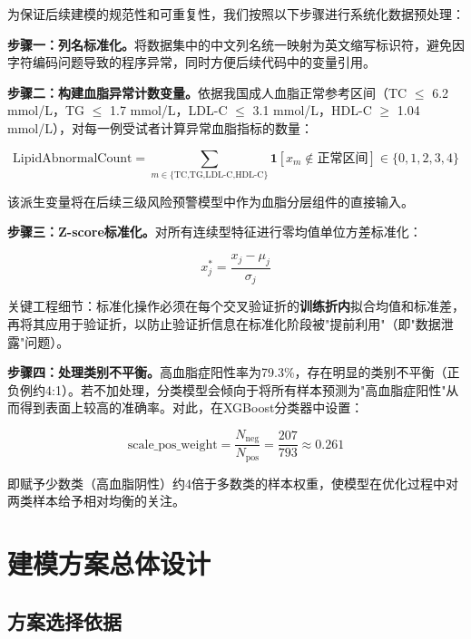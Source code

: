 \documentclass[12pt,a4paper]{ctexart}
\begin{document}
为保证后续建模的规范性和可重复性，我们按照以下步骤进行系统化数据预处理：

\textbf{步骤一：列名标准化。}将数据集中的中文列名统一映射为英文缩写标识符，避免因字符编码问题导致的程序异常，同时方便后续代码中的变量引用。

\textbf{步骤二：构建血脂异常计数变量。}依据我国成人血脂正常参考区间（TC $\leq$ 6.2 mmol/L，TG $\leq$ 1.7 mmol/L，LDL-C $\leq$ 3.1 mmol/L，HDL-C $\geq$ 1.04 mmol/L），对每一例受试者计算异常血脂指标的数量：

\begin{equation}
\text{LipidAbnormalCount} = \sum_{m \in \{\text{TC,TG,LDL-C,HDL-C}\}} \mathbf{1}[x_m \notin \text{正常区间}] \in \{0, 1, 2, 3, 4\}
\label{eq:lipidcount}
\end{equation}

该派生变量将在后续三级风险预警模型中作为血脂分层组件的直接输入。

\textbf{步骤三：Z-score标准化。}对所有连续型特征进行零均值单位方差标准化：

\begin{equation}
x_j^* = \frac{x_j - \mu_j}{\sigma_j}
\label{eq:zscore}
\end{equation}

关键工程细节：标准化操作必须在每个交叉验证折的\textbf{训练折内}拟合均值和标准差，再将其应用于验证折，以防止验证折信息在标准化阶段被"提前利用"（即"数据泄露"问题）。

\textbf{步骤四：处理类别不平衡。}高血脂症阳性率为79.3\%，存在明显的类别不平衡（正负例约4:1）。若不加处理，分类模型会倾向于将所有样本预测为"高血脂症阳性"从而得到表面上较高的准确率。对此，在XGBoost分类器中设置：

\begin{equation}
\text{scale\_pos\_weight} = \frac{N_{\text{neg}}}{N_{\text{pos}}} = \frac{207}{793} \approx 0.261
\label{eq:classweight}
\end{equation}

即赋予少数类（高血脂阴性）约4倍于多数类的样本权重，使模型在优化过程中对两类样本给予相对均衡的关注。


\section{建模方案总体设计}

\subsection{方案选择依据}
\end{document}
